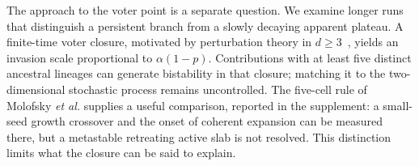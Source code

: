 The approach to the voter point is a separate question. We examine longer
runs that distinguish a persistent branch from a slowly decaying apparent
plateau. A finite-time voter closure, motivated by perturbation theory
in $d\ge3$~\cite{cox2013}, yields an invasion scale proportional to
$\alpha(1-p)$. Contributions with at least five distinct ancestral
lineages can generate bistability in that closure; matching it to the
two-dimensional stochastic process remains uncontrolled.
The five-cell rule of Molofsky \emph{et al.} supplies a useful comparison,
reported in the supplement: a small-seed growth crossover and the onset
of coherent expansion can be measured there, but a metastable retreating
active slab is not resolved. This distinction limits what the closure
can be said to explain.
